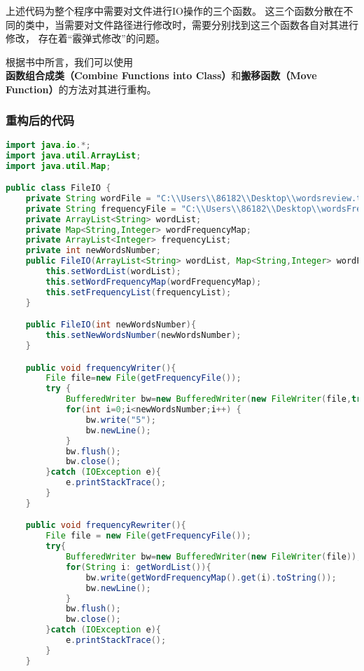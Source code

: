 \documentclass[a4paper]{article}
\begin{document}
上述代码为整个程序中需要对文件进行IO操作的三个函数。
这三个函数分散在不同的类中，当需要对文件路径进行修改时，需要分别找到这三个函数各自对其进行修改，
存在着“霰弹式修改”的问题。

根据书中所言，我们可以使用\textbf{函数组合成类（Combine Functions into Class）}和\textbf{搬移函数（Move Function）}的方法对其进行重构。
\subsubsection*{重构后的代码}
\begin{lstlisting}[language={java}]
    import java.io.*;
import java.util.ArrayList;
import java.util.Map;

public class FileIO {
    private String wordFile = "C:\\Users\\86182\\Desktop\\wordsreview.txt";
    private String frequencyFile = "C:\\Users\\86182\\Desktop\\wordsFrequency.txt";
    private ArrayList<String> wordList;
    private Map<String,Integer> wordFrequencyMap;
    private ArrayList<Integer> frequencyList;
    private int newWordsNumber;
    public FileIO(ArrayList<String> wordList, Map<String,Integer> wordFrequencyMap, ArrayList<Integer> frequencyList){
        this.setWordList(wordList);
        this.setWordFrequencyMap(wordFrequencyMap);
        this.setFrequencyList(frequencyList);
    }

    public FileIO(int newWordsNumber){
        this.setNewWordsNumber(newWordsNumber);
    }

    public void frequencyWriter(){
        File file=new File(getFrequencyFile());
        try {
            BufferedWriter bw=new BufferedWriter(new FileWriter(file,true));
            for(int i=0;i<newWordsNumber;i++) {
                bw.write("5");
                bw.newLine();
            }
            bw.flush();
            bw.close();
        }catch (IOException e){
            e.printStackTrace();
        }
    }

    public void frequencyRewriter(){
        File file = new File(getFrequencyFile());
        try{
            BufferedWriter bw=new BufferedWriter(new FileWriter(file));
            for(String i: getWordList()){
                bw.write(getWordFrequencyMap().get(i).toString());
                bw.newLine();
            }
            bw.flush();
            bw.close();
        }catch (IOException e){
            e.printStackTrace();
        }
    }


\end{lstlisting}
\end{document}
